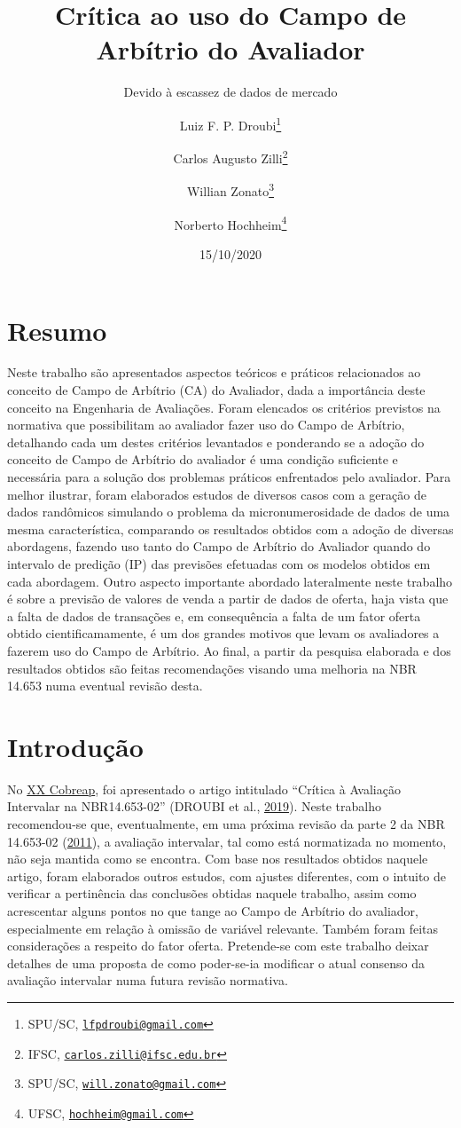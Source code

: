 \documentclass[
  a4paper, 11pt]{article}
\title{Crítica ao uso do Campo de Arbítrio do Avaliador}
\subtitle{Devido à escassez de dados de mercado}
\author{Luiz F. P. Droubi\footnote{SPU/SC,
  \href{mailto:lfpdroubi@gmail.com}{\nolinkurl{lfpdroubi@gmail.com}}} \and Carlos Augusto Zilli\footnote{IFSC,
  \href{mailto:carlos.zilli@ifsc.edu.br}{\nolinkurl{carlos.zilli@ifsc.edu.br}}} \and Willian Zonato\footnote{SPU/SC,
  \href{mailto:will.zonato@gmail.com}{\nolinkurl{will.zonato@gmail.com}}} \and Norberto Hochheim\footnote{UFSC,
  \href{mailto:hochheim@gmail.com}{\nolinkurl{hochheim@gmail.com}}}}
\date{15/10/2020}
\begin{document}
\maketitle

\hypertarget{resumo}{%
\section*{Resumo}\label{resumo}}

Neste trabalho são apresentados aspectos teóricos e práticos
relacionados ao conceito de Campo de Arbítrio (CA) do Avaliador, dada a
importância deste conceito na Engenharia de Avaliações. Foram elencados
os critérios previstos na normativa que possibilitam ao avaliador fazer
uso do Campo de Arbítrio, detalhando cada um destes critérios levantados
e ponderando se a adoção do conceito de Campo de Arbítrio do avaliador é
uma condição suficiente e necessária para a solução dos problemas
práticos enfrentados pelo avaliador. Para melhor ilustrar, foram
elaborados estudos de diversos casos com a geração de dados randômicos
simulando o problema da micronumerosidade de dados de uma mesma
característica, comparando os resultados obtidos com a adoção de
diversas abordagens, fazendo uso tanto do Campo de Arbítrio do Avaliador
quando do intervalo de predição (IP) das previsões efetuadas com os
modelos obtidos em cada abordagem. Outro aspecto importante abordado
lateralmente neste trabalho é sobre a previsão de valores de venda a
partir de dados de oferta, haja vista que a falta de dados de transações
e, em consequência a falta de um fator oferta obtido cientificamamente,
é um dos grandes motivos que levam os avaliadores a fazerem uso do Campo
de Arbítrio. Ao final, a partir da pesquisa elaborada e dos resultados
obtidos são feitas recomendações visando uma melhoria na NBR 14.653 numa
eventual revisão desta.

\hypertarget{introduuxe7uxe3o}{%
\section{Introdução}\label{introduuxe7uxe3o}}

No \href{http://www.cobreap.com.br/2019/}{XX Cobreap}, foi apresentado o
artigo intitulado ``Crítica à Avaliação Intervalar na NBR14.653-02''
(DROUBI et al., \protect\hyperlink{ref-droubi2019}{2019}). Neste
trabalho recomendou-se que, eventualmente, em uma próxima revisão da
parte 2 da NBR 14.653-02 (\protect\hyperlink{ref-NBR1465302}{2011}), a
avaliação intervalar, tal como está normatizada no momento, não seja
mantida como se encontra. Com base nos resultados obtidos naquele
artigo, foram elaborados outros estudos, com ajustes diferentes, com o
intuito de verificar a pertinência das conclusões obtidas naquele
trabalho, assim como acrescentar alguns pontos no que tange ao Campo de
Arbítrio do avaliador, especialmente em relação à omissão de variável
relevante. Também foram feitas considerações a respeito do fator oferta.
Pretende-se com este trabalho deixar detalhes de uma proposta de como
poder-se-ia modificar o atual consenso da avaliação intervalar numa
futura revisão normativa.
\end{document}
